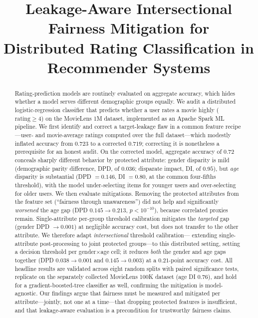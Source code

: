 \documentclass[conference]{IEEEtran}
\begin{document}
\title{Leakage-Aware Intersectional Fairness Mitigation for\\
Distributed Rating Classification in Recommender Systems}

\author{
}

\maketitle

\begin{abstract}
Rating-prediction models are routinely evaluated on aggregate accuracy, which
hides whether a model serves different demographic groups equally. We audit a
distributed logistic-regression classifier that predicts whether a user rates a
movie highly ($\text{rating}\geq 4$) on the MovieLens 1M dataset, implemented as an
Apache Spark ML pipeline. We first identify and correct a target-leakage flaw in a
common feature recipe---user- and movie-average ratings computed over the full
dataset---which modestly inflated accuracy from $0.723$ to a corrected $0.719$;
correcting it is nonetheless a prerequisite for an honest audit. On the corrected
model, aggregate accuracy of $0.72$ conceals sharply different behavior by protected
attribute: gender disparity is mild (demographic parity difference, DPD, of $0.036$;
disparate impact, DI, of $0.95$), but \emph{age} disparity is substantial
(DPD $=0.146$, DI $=0.80$, at the common four-fifths threshold), with the model
under-selecting items for younger users and over-selecting for older users. We then
evaluate mitigations. Removing the protected attributes from the feature set
(``fairness through unawareness'') did not help and significantly \emph{worsened} the
age gap (DPD $0.145\rightarrow0.213$, $p<10^{-10}$), because correlated proxies remain.
Single-attribute per-group threshold calibration mitigates the \emph{targeted} gap
(gender DPD $\rightarrow 0.001$) at negligible accuracy cost, but does not transfer to
the other attribute. We therefore adapt \emph{intersectional} threshold calibration---
extending single-attribute post-processing to joint protected groups---to this distributed
setting, setting a decision threshold per gender$\times$age cell; it reduces \emph{both} the
gender and age gaps together (DPD $0.038\rightarrow0.001$ and $0.145\rightarrow0.003$) at
a $0.21$-point accuracy cost. All headline results are validated across eight random
splits with paired significance tests, replicate on the separately collected MovieLens
100K dataset (age DI $0.76$), and hold for a gradient-boosted-tree classifier as well,
confirming the mitigation is model-agnostic. Our findings argue that fairness must be
measured and mitigated per attribute---jointly, not one at a time---that dropping protected
features is insufficient, and that leakage-aware evaluation is a precondition for
trustworthy fairness claims.
\end{abstract}
\end{document}
